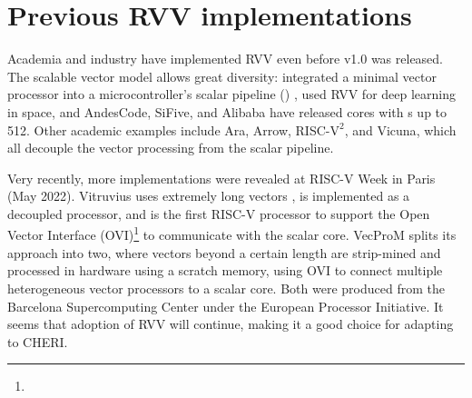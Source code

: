\section{Previous RVV implementations\label{chap:bg:rvvend}}
Academia and industry have implemented RVV even before v1.0 was released.
The scalable vector model allows great diversity: \citeauthor{johnsMinimalRISCVVector2020} integrated a minimal vector processor into a microcontroller's scalar pipeline () \cite{johnsMinimalRISCVVector2020}, \citeauthor{dimascioOnBoardDecisionMaking2021} used RVV for deep learning in space\cite{dimascioOnBoardDecisionMaking2021}, and AndesCode, SiFive, and Alibaba have released cores with s up to 512\cite{AndesCoreNX27VProcessor}\cite{SiFiveIntelligenceX280}\cite{chenXuantie910CommercialMultiCore2020}.
Other academic examples include Ara\cite{cavalcanteAra1GHzScalable2020}, Arrow\cite{assirArrowRISCVVector2021}, RISC-$\text{V}^2$\cite{patsidisRISCV2ScalableRISCV2020}, and Vicuna\cite{platzerVicunaTimingPredictableRISCV2021}, which all decouple the vector processing from the scalar pipeline.

Very recently, more implementations were revealed at RISC-V Week in Paris (May 2022).
Vitruvius\cite{minerviniVitruviusAreaEfficientRISCV2022} uses extremely long vectors , is implemented as a decoupled processor, and is the first RISC-V processor to support the Open Vector Interface (OVI)\footnote{} to communicate with the scalar core.
VecProM\cite{mahaleRISCVVPUVery2021} splits its approach into two, where vectors beyond a certain length are strip-mined and processed in hardware using a scratch memory, using OVI to connect multiple heterogeneous vector processors to a scalar core.
Both were produced from the Barcelona Supercomputing Center under the European Processor Initiative.
It seems that adoption of RVV will continue, making it a good choice for adapting to CHERI.

